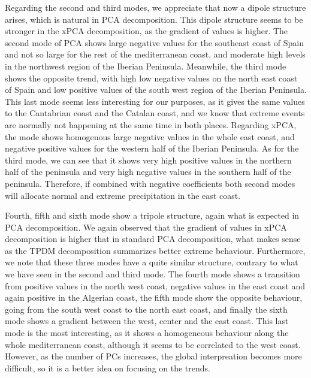 \documentclass[11pt, oneside]{book}
\theoremstyle{plain}
\theoremstyle{remark}
\begin{document}
Regarding the second and third modes, we appreciate that now a dipole structure
arises, which is natural in PCA decomposition. This dipole structure seems to be
stronger in the xPCA decomposition, as the gradient of values is higher. The
second mode of PCA shows large negative values for the southeast coast of Spain
and not so large for the rest of the mediterranean coast, and moderate high
levels in the northwest region of the Iberian Peninsula. Meanwhile, the third
mode shows the opposite trend, with high low negative values on the north east
coast of Spain and low positive values of the south west region of the Iberian
Peninsula. This last mode seems less interesting for our purposes, as it gives
the same values to the Cantabrian coast and the Catalan coast, and we know that
extreme events are normally not happening at the same time in both places.
Regarding xPCA, the mode shows homogenous large negative values in the whole
east coast, and negative positive values for the western half of the Iberian
Peninsula. As for the third mode, we can see that it shows very high positive
values in the northern half of the peninsula and very high negative values in
the southern half of the peninsula. Therefore, if combined with negative
coefficients both second modes will allocate normal and extreme precipitation in
the east coast. 

Fourth, fifth and sixth mode show a tripole structure, again what is expected in
PCA decomposition. We again observed that the gradient of values in xPCA
decomposition is higher that in standard PCA decomposition, what makes sense as
the TPDM decomposition summarizes better extreme behaviour. Furthermore, we note
that these three modes have a quite similar structure, contrary to what we have
seen in the second and third mode. The fourth mode shows a transition from
positive values in the north west coast, negative values in the east coast and
again positive in the Algerian coast, the fifth mode show the opposite
behaviour, going from the south west coast to the north east coast, and finally 
the sixth mode shows a gradient between the west, center and the east coast.
This last mode is the most interesting, as it shows a homogeneous behaviour
along the whole mediterranean coast, although it seems to be correlated to the
west coast. However, as the number of PCs increases, the global interpreation
becomes more difficult, so it is a better idea on focusing on the trends. 
\end{document}

